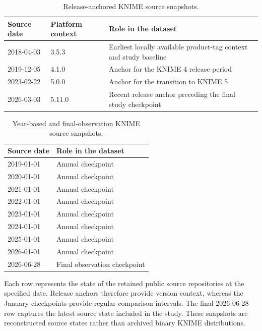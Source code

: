 \documentclass[runningheads]{llncs}
\begin{document}
\begin{table}
\centering
\caption{Release-anchored KNIME source snapshots.}
\label{tab:release-snapshots}
\small
\begin{tabular}{p{}p{}p{}}
\toprule
Source date & Platform context & Role in the dataset \\
\midrule
2018-04-03 & 3.5.3 & Earliest locally available product-tag context and
study baseline \\
2019-12-05 & 4.1.0 & Anchor for the KNIME 4 release period \\
2023-02-22 & 5.0.0 & Anchor for the transition to KNIME 5 \\
2026-03-03 & 5.11.0 & Recent release anchor preceding the final study
checkpoint \\
\bottomrule
\end{tabular}
\end{table}

\begin{table}
\centering
\caption{Year-based and final-observation KNIME source snapshots.}
\label{tab:calendar-snapshots}
\small
\begin{tabular}{p{}p{}}
\toprule
Source date & Role in the dataset \\
\midrule
2019-01-01 & Annual checkpoint \\
2020-01-01 & Annual checkpoint \\
2021-01-01 & Annual checkpoint \\
2022-01-01 & Annual checkpoint \\
2023-01-01 & Annual checkpoint \\
2024-01-01 & Annual checkpoint \\
2025-01-01 & Annual checkpoint \\
2026-01-01 & Annual checkpoint \\
2026-06-28 & Final observation checkpoint \\
\bottomrule
\end{tabular}
\end{table}

Each row represents the state of the retained public source repositories at
the specified date. Release anchors therefore provide version context, whereas
the January checkpoints provide regular comparison intervals. The final
2026-06-28 row captures the latest source state included in the study. These
snapshots are reconstructed source states rather than archived binary KNIME
distributions.
\end{document}
